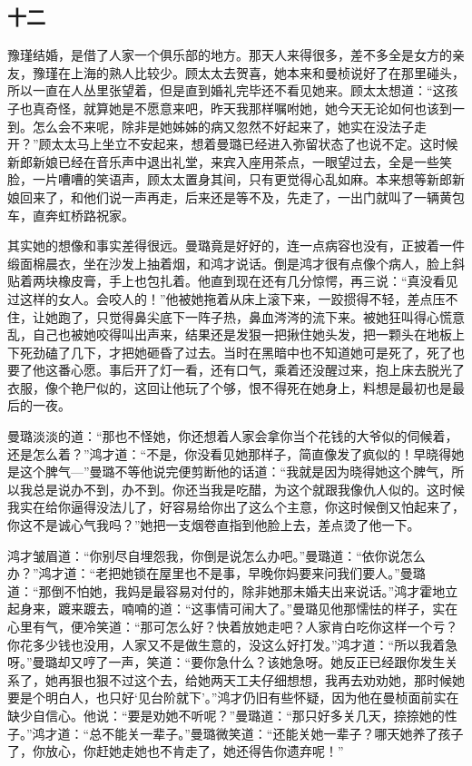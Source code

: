 \subsection{十二}

\par 豫瑾结婚，是借了人家一个俱乐部的地方。那天人来得很多，差不多全是女方的亲友，豫瑾在上海的熟人比较少。顾太太去贺喜，她本来和曼桢说好了在那里碰头，所以一直在人丛里张望着，但是直到婚礼完毕还不看见她来。顾太太想道：“这孩子也真奇怪，就算她是不愿意来吧，昨天我那样嘱咐她，她今天无论如何也该到一到。怎么会不来呢，除非是她姊姊的病又忽然不好起来了，她实在没法子走开？”顾太太马上坐立不安起来，想着曼璐已经进入弥留状态了也说不定。这时候新郎新娘已经在音乐声中退出礼堂，来宾入座用茶点，一眼望过去，全是一些笑脸，一片嘈嘈的笑语声，顾太太置身其间，只有更觉得心乱如麻。本来想等新郎新娘回来了，和他们说一声再走，后来还是等不及，先走了，一出门就叫了一辆黄包车，直奔虹桥路祝家。
\par 其实她的想像和事实差得很远。曼璐竟是好好的，连一点病容也没有，正披着一件缎面棉晨衣，坐在沙发上抽着烟，和鸿才说话。倒是鸿才很有点像个病人，脸上斜贴着两块橡皮膏，手上也包扎着。他直到现在还有几分惊愕，再三说：“真没看见过这样的女人。会咬人的！”他被她拖着从床上滚下来，一跤掼得不轻，差点压不住，让她跑了，只觉得鼻尖底下一阵子热，鼻血涔涔的流下来。被她狂叫得心慌意乱，自己也被她咬得叫出声来，结果还是发狠一把揪住她头发，把一颗头在地板上下死劲磕了几下，才把她砸昏了过去。当时在黑暗中也不知道她可是死了，死了也要了他这番心愿。事后开了灯一看，还有口气，乘着还没醒过来，抱上床去脱光了衣服，像个艳尸似的，这回让他玩了个够，恨不得死在她身上，料想是最初也是最后的一夜。
\par 曼璐淡淡的道：“那也不怪她，你还想着人家会拿你当个花钱的大爷似的伺候着，还是怎么着？”鸿才道：“不是，你没看见她那样子，简直像发了疯似的！早晓得她是这个脾气—”曼璐不等他说完便剪断他的话道：“我就是因为晓得她这个脾气，所以我总是说办不到，办不到。你还当我是吃醋，为这个就跟我像仇人似的。这时候我实在给你逼得没法儿了，好容易给你出了这么个主意，你这时候倒又怕起来了，你这不是诚心气我吗？”她把一支烟卷直指到他脸上去，差点烫了他一下。
\par 鸿才皱眉道：“你别尽自埋怨我，你倒是说怎么办吧。”曼璐道：“依你说怎么办？”鸿才道：“老把她锁在屋里也不是事，早晚你妈要来问我们要人。”曼璐道：“那倒不怕她，我妈是最容易对付的，除非她那未婚夫出来说话。”鸿才霍地立起身来，踱来踱去，喃喃的道：“这事情可闹大了。”曼璐见他那懦怯的样子，实在心里有气，便冷笑道：“那可怎么好？快着放她走吧？人家肯白吃你这样一个亏？你花多少钱也没用，人家又不是做生意的，没这么好打发。”鸿才道：“所以我着急呀。”曼璐却又哼了一声，笑道：“要你急什么？该她急呀。她反正已经跟你发生关系了，她再狠也狠不过这个去，给她两天工夫仔细想想，我再去劝劝她，那时候她要是个明白人，也只好‘见台阶就下’。”鸿才仍旧有些怀疑，因为他在曼桢面前实在缺少自信心。他说：“要是劝她不听呢？”曼璐道：“那只好多关几天，捺捺她的性子。”鸿才道：“总不能关一辈子。”曼璐微笑道：“还能关她一辈子？哪天她养了孩子了，你放心，你赶她走她也不肯走了，她还得告你遗弃呢！”
